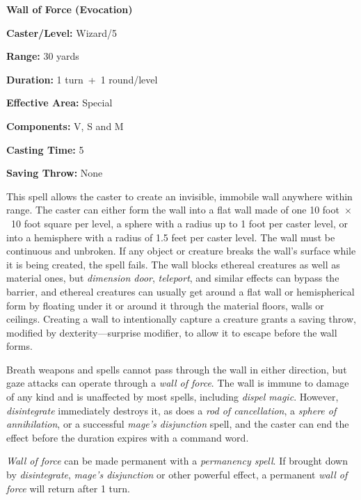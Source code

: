 \begin{multicols}{2}
\vspace{1em}

\noindent
\begin{minipage}{\columnwidth}

\noindent \textbf{Wall of Force (Evocation)}

\noindent \textbf{Caster/Level:} Wizard/5

\noindent \textbf{Range:} 30 yards

\noindent \textbf{Duration:} 1 turn~+~1 round/level

\noindent \textbf{Effective Area:} Special

\noindent \textbf{Components:} V, S and M

\noindent \textbf{Casting Time:} 5

\noindent \textbf{Saving Throw:} None

\end{minipage}

This spell allows the caster to create an invisible, immobile wall anywhere within range.  The caster can either form the wall into a flat wall made of one 10 foot~$\times$~10 foot square per level, a sphere with a radius up to 1 foot per caster level, or into a hemisphere with a radius of 1.5 feet per caster level.  The wall must be continuous and unbroken.  If any object or creature breaks the wall's surface while it is being created, the spell fails.  The wall blocks ethereal creatures as well as material ones, but \textit{dimension door}, \textit{teleport}, and similar effects can bypass the barrier, and ethereal creatures can usually get around a flat wall or hemispherical form by floating under it or around it through the material floors, walls or ceilings.  Creating a wall to intentionally capture a creature grants a saving throw, modified by dexterity---surprise modifier, to allow it to escape before the wall forms.  

Breath weapons and spells cannot pass through the wall in either direction, but gaze attacks can operate through a \textit{wall of force}.  The wall is immune to damage of any kind and is unaffected by most spells, including \textit{dispel magic}.  However, \textit{disintegrate} immediately destroys it, as does a \textit{rod of cancellation}, a \textit{sphere of annihilation}, or a successful \textit{mage's disjunction} spell, and the caster can end the effect before the duration expires with a command word.

\textit{Wall of force} can be made permanent with a \textit{permanency spell}.  If brought down by \textit{disintegrate}, \textit{mage's disjunction} or other powerful effect, a permanent \textit{wall of force} will return after 1 turn. 


\end{multicols}
